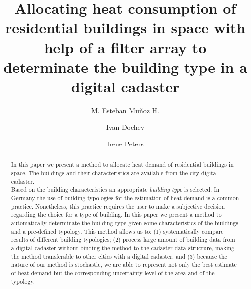 \documentclass[authoryear,preprint,review,12pt]{elsarticle}
\begin{document}
\begin{frontmatter}



\title{Allocating heat consumption of residential buildings in space with help
    of a filter array to determinate the building type in a digital cadaster}

\author[HCU]{M. Esteban Mu\~{n}oz H.}
\author[HCU]{Ivan Dochev}
\author[HCU]{Irene Peters}

\address[HCU]{HafenCity Universit\"{a}t, Hamburg, DE}


\begin{abstract}
In this paper we present a method to allocate heat demand of residential
buildings in space. The buildings and their characteristics are available from
the city digital cadaster.\\

Based on the building characteristics an appropriate \textit{building type} is
selected. In Germany the use of building typologies for the estimation of heat
demand is a common practice. Nonetheless, this practice requires the user to
make a subjective decision regarding the choice for a type of building. In
this paper we present a method to automatically determinate the building type
given some characteristics of the buildings and a pre-defined typology. This method
allows us to: (1) systematically compare results of different building
typologies; (2) process large amount of building data from a digital cadaster
without binding the method to the cadaster data structure, making the method
transferable to other cities with a digital cadaster; and (3) because the
nature of our method is stochastic, we are able to represent not only the best
estimate of heat demand but the corresponding uncertainty level of the area and
of the typology.  \\


\end{abstract}
\end{frontmatter}
\end{document}
